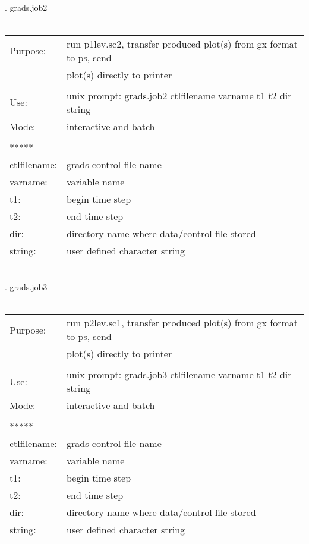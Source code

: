 \\
\\
\\
\\ 
. grads.job2 \\ \\
\begin{tabular}{ll}
Purpose:     &  run p1lev.sc2, transfer produced plot(s) from gx format to ps, send \\
             &  plot(s) directly to printer  \\
\\
Use:         &  unix prompt: grads.job2 ctlfilename varname t1 t2 dir  string     \\
Mode:        &  interactive and batch        \\ 
\\
*****  \\
ctlfilename: &  grads control file name     \\
varname:     &  variable name     \\
t1:       &  begin time step    \\
t2:       &  end time step    \\
dir:      &  directory name where data/control file stored \\ 
string:   &  user defined character string  
\end{tabular}
\\ 
\newpage
{}. grads.job3 \\ \\
\begin{tabular}{ll}
Purpose:     &  run p2lev.sc1, transfer produced plot(s) from gx format to ps, send \\
             &  plot(s) directly to printer  \\
\\
Use:         &  unix prompt: grads.job3 ctlfilename varname t1 t2 dir  string     \\
Mode:        &  interactive and batch        \\ 
\\
*****  \\
ctlfilename: &  grads control file name     \\
varname:     &  variable name     \\
t1:       &  begin time step    \\
t2:       &  end time step    \\
dir:      &  directory name where data/control file stored  \\
string:   &  user defined character string  
\end{tabular}
